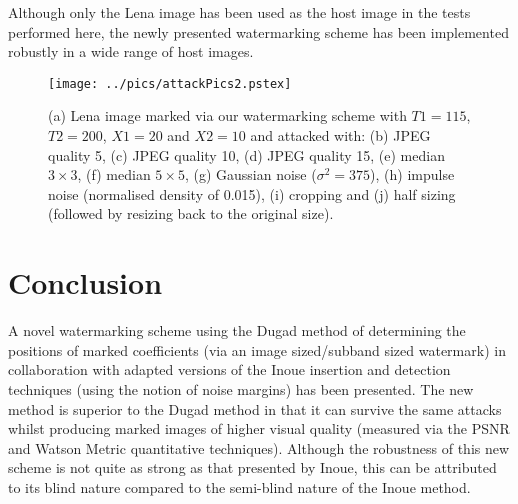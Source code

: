 \documentclass[10pt,twocolumn]{article}
\begin{document}
Although only the Lena image has been used as the host image in the tests performed here,
the newly presented watermarking scheme has been implemented robustly in a wide range of host images.

\begin{figure*}[htb]
       \begin{center}
               \texttt{[image: ../pics/attackPics2.pstex]}  
	\caption{(a) Lena image marked via our watermarking scheme with
		$T1=115$, $T2=200$, $X1=20$ and $X2=10$ and attacked with: 
               (b) JPEG quality 5, (c) JPEG quality 10, (d) JPEG quality 15,
               (e) median $3 \times 3$, (f) median $5 \times 5$, (g) Gaussian noise ($\sigma^{2}=375$),
               (h) impulse noise (normalised density of 0.015), (i) cropping and (j) half sizing (followed by resizing back to
               the original size).}
               \label{allAttacks}
       \end{center}
\end{figure*}

\section{Conclusion}
A novel watermarking scheme using the Dugad method of determining the positions
of marked coefficients (via an image sized/subband sized watermark)
in collaboration with adapted versions of the Inoue insertion and detection techniques (using the notion of noise margins)
has been
presented. The new method is superior
to the Dugad method in that it can survive the same attacks
whilst producing marked images of higher visual quality (measured via the PSNR and Watson Metric quantitative techniques). 
Although the robustness of this new scheme is not quite as 
strong as that presented by Inoue, this can be attributed
to its blind nature compared to the semi-blind nature
of the
Inoue method. 
\end{document}
